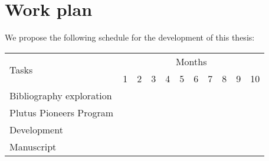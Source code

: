 \documentclass[12pt]{book}
\begin{document}









\section{Work plan}

We propose the following schedule for the development of this thesis:

\bigskip

\begin{center}
\def\arraystretch{1.5}
\begin{tabular}{ |l|c|c|c|c|c|c|c|c|c|c| }

 \hline
 \multirow{2}{1em}{Tasks} & \multicolumn{10}{|c|}{Months}\\  \cline{2-11} &
     1 & 2 & 3 & 4 & 5 & 6 & 7 & 8 & 9 & 10 \\  \hline
 Bibliography exploration & \cellcolor{gray} & \cellcolor{gray} &  &  & &  &  &  &  &   \\
 \hline
Plutus Pioneers Program &  & \cellcolor{gray} & \cellcolor{gray} &  &  &  & & &  &  \\
 \hline
Development &  &  & \cellcolor{gray} & \cellcolor{gray} & \cellcolor{gray} &  \cellcolor{gray} & \cellcolor{gray} & \cellcolor{gray} &  & \\
 \hline
Manuscript &  &  &  &  &  &  & & \cellcolor{gray} & \cellcolor{gray} & \cellcolor{gray}    \\
 \hline
\end{tabular}
\end{center}
\end{document}
